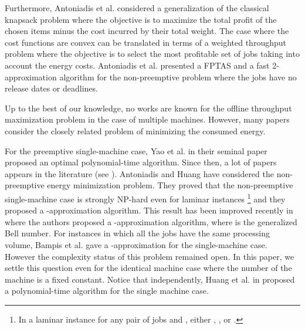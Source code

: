 \documentclass[11pt,a4paper]{article}
\begin{document}
Furthermore, Antoniadis et al. \cite{AHOV13} considered a generalization of the classical knapsack problem where the objective is to maximize the total profit of the chosen items minus the cost incurred by their total weight. The case where the cost functions are convex can be translated in terms of a weighted throughput problem where the objective is to select the most profitable set of jobs taking into account the energy costs. Antoniadis et al. presented a FPTAS and a fast 2-approximation algorithm for the non-preemptive problem where the jobs have no release dates or deadlines.

Up to the best of our knowledge, no works are known for the offline throughput maximization problem in the case of multiple machines. However, many papers consider the closely related problem of minimizing the consumed energy.

For the preemptive single-machine case, Yao et al.\cite{YDS95} in their seminal paper proposed an optimal polynomial-time algorithm. Since then, a lot of papers appears in the literature (see \cite{Albers10}).
Antoniadis and Huang \cite{AH13} have considered the non-preemptive energy minimization problem. They proved that the non-preemptive single-machine case
is strongly NP-hard even for laminar instances \footnote{In a laminar instance  for any
pair of jobs  and , either , 
, or .} and they proposed a 
-approximation algorithm. This result has been improved recently in \cite{DBLP:conf/fsttcs/BKLLS13} where the authors proposed a -approximation algorithm, where  is the generalized Bell number.
For instances in which all the jobs have the same processing volume,
Bampis et al. \cite{BKLLN13} gave a -approximation for the single-machine case.
However the complexity status of this problem remained open.
In this paper, we settle this question even for the identical machine case where the number of the machine is a fixed constant. Notice that independently, Huang et al. in \cite{HO13} proposed a polynomial-time algorithm for the single machine case.
\end{document}
